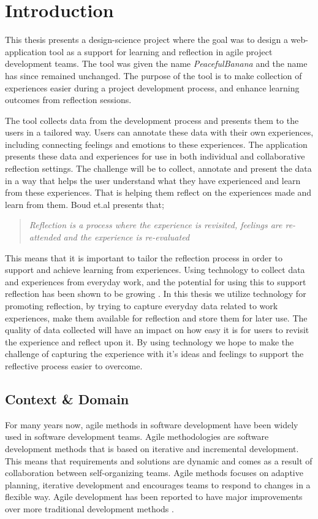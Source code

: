 \chapter{Introduction}
\label{cha:introduction}
This thesis presents a design-science project where the goal was to design a web-application tool as a support for learning and reflection in agile project development teams. The tool was given the name \emph{PeacefulBanana} and the name has since remained unchanged. The purpose of the tool is to make collection of experiences easier during a project development process, and enhance learning outcomes from reflection sessions. 

The tool collects data from the development process and presents them to the users in a tailored way. Users can annotate these data with their own experiences, including connecting feelings and emotions to these experiences. The application presents these data and experiences for use in both individual and collaborative reflection settings. The challenge will be to collect, annotate and present the data in a way that helps the user understand what they have experienced and learn from these experiences. That is helping them reflect on the experiences made and learn from them. Boud et.al\citep{boudreflection1985} presents that; 
\begin{quote}
\emph{Reflection is a process where the experience is revisited, feelings are re-attended and the experience is re-evaluated}
\end{quote}
This means that it is important to tailor the reflection process in order to support and achieve learning from experiences. Using technology to collect data and experiences from everyday work, and the potential for using this to support reflection has been shown to be growing \citep{li2011understanding}. In this thesis we utilize technology for promoting reflection, by trying to capture everyday data related to work experiences, make them available for reflection and store them for later use. The quality of data collected will have an impact on how easy it is for users to revisit the experience and reflect upon it. By using technology we hope to make the challenge of capturing the experience with it's ideas and feelings to support the reflective process easier to overcome. 

\section{Context \& Domain}
For many years now, agile methods in software development have been widely used in software development teams. Agile methodologies are software development methods that is based on iterative and incremental development. This means that requirements and solutions are dynamic and comes as a result of collaboration between self-organizing teams. Agile methods focuses on adaptive planning, iterative development and encourages teams to respond to changes in a flexible way. Agile development has been reported to have major improvements over more traditional development methods \citep{dybadings}. 

